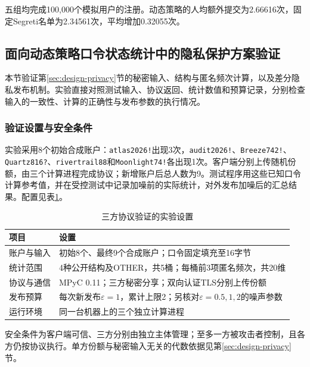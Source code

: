 \documentclass{crypto_report}
\begin{document}
五组均完成100,000个模拟用户的注册。动态策略的人均额外提交为2.66616次，固定Segreti名单为2.34561次，平均增加0.32055次。




\setcounter{subsection}{2}
\subsection{面向动态策略口令状态统计中的隐私保护方案验证}\label{sec:validation-privacy}

本节验证第\ref{sec:design-privacy}节的秘密输入、结构与匿名频次计算，以及差分隐私发布机制。实验直接对照测试输入、协议返回、统计数值和预算记录，分别检查输入的一致性、计算的正确性与发布参数的执行情况。

\subsubsection{验证设置与安全条件}\label{sec:validation-privacy-1}

实验采用8个初始合成账户：\texttt{atlas2026!}出现3次，\texttt{audit2026!}、\texttt{Breeze742!}、\texttt{Quartz816?}、\texttt{rivertrail88}和\texttt{Moonlight74!}各出现1次。客户端分别上传随机份额，由三个计算进程完成协议；新增账户后总人数为9。测试程序用这些已知口令计算参考值，并在受控测试中记录加噪前的实际统计，对外发布加噪后的汇总结果。配置见表\ref{tab:privacy-validation-settings}。

\begin{table}[H]
\centering
\caption{三方协议验证的实验设置}\label{tab:privacy-validation-settings}
\small
\begin{tabularx}{\linewidth}{@{}lX@{}}
\toprule
项目 & 设置 \\
\midrule
账户与输入 & 初始8个、最终9个合成账户；口令固定填充至16字节 \\
统计范围 & 4种公开结构及OTHER，共5桶；每桶前3项匿名频次，共20维 \\
协议与通信 & MPyC 0.11；三方秘密分享；双向认证TLS分别上传份额 \\
发布预算 & 每次新发布$\varepsilon=1$，累计上限2；另核对$\varepsilon=0.5,1,2$的噪声参数 \\
运行环境 & 同一台机器上的三个独立计算进程 \\
\bottomrule
\end{tabularx}
\end{table}

安全条件为客户端可信、三方分别由独立主体管理；至多一方被攻击者控制，且各方仍按协议执行。单方份额与秘密输入无关的代数依据见第\ref{sec:design-privacy}节。
\end{document}
